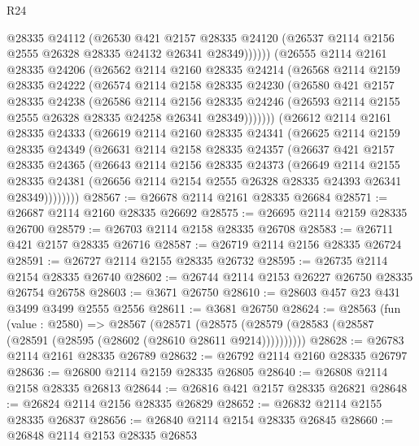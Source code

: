 \begin{lexlean}{R24}
\begin{coremodule}
            @28335
            @24112
            (@26530
              @421
              @2157
              @28335
              @24120
              (@26537 @2114 @2156 @2555 @26328 @28335 @24132 @26341 @28349))))))
    (@26555
      @2114
      @2161
      @28335
      @24206
      (@26562
        @2114
        @2160
        @28335
        @24214
        (@26568
          @2114
          @2159
          @28335
          @24222
          (@26574
            @2114
            @2158
            @28335
            @24230
            (@26580
              @421
              @2157
              @28335
              @24238
              (@26586
                @2114
                @2156
                @28335
                @24246
                (@26593 @2114 @2155 @2555 @26328 @28335 @24258 @26341 @28349)))))))
    (@26612
      @2114
      @2161
      @28335
      @24333
      (@26619
        @2114
        @2160
        @28335
        @24341
        (@26625
          @2114
          @2159
          @28335
          @24349
          (@26631
            @2114
            @2158
            @28335
            @24357
            (@26637
              @421
              @2157
              @28335
              @24365
              (@26643
                @2114
                @2156
                @28335
                @24373
                (@26649
                  @2114
                  @2155
                  @28335
                  @24381
                  (@26656 @2114 @2154 @2555 @26328 @28335 @24393 @26341 @28349))))))))
@28567 := @26678 @2114 @2161 @28335 @26684
@28571 := @26687 @2114 @2160 @28335 @26692
@28575 := @26695 @2114 @2159 @28335 @26700
@28579 := @26703 @2114 @2158 @28335 @26708
@28583 := @26711 @421 @2157 @28335 @26716
@28587 := @26719 @2114 @2156 @28335 @26724
@28591 := @26727 @2114 @2155 @28335 @26732
@28595 := @26735 @2114 @2154 @28335 @26740
@28602 := @26744 @2114 @2153 @26227 @26750 @28335 @26754 @26758
@28603 := @3671 @26750
@28610 := @28603 @457 @23 @431 @3499 @3499 @2555 @2556
@28611 := @3681 @26750
@28624 := @28563
    (fun (value : @2580) =>
    @28567
      (@28571 (@28575 (@28579 (@28583 (@28587 (@28591 (@28595 (@28602 (@28610 @28611 @9214))))))))))
@28628 := @26783 @2114 @2161 @28335 @26789
@28632 := @26792 @2114 @2160 @28335 @26797
@28636 := @26800 @2114 @2159 @28335 @26805
@28640 := @26808 @2114 @2158 @28335 @26813
@28644 := @26816 @421 @2157 @28335 @26821
@28648 := @26824 @2114 @2156 @28335 @26829
@28652 := @26832 @2114 @2155 @28335 @26837
@28656 := @26840 @2114 @2154 @28335 @26845
@28660 := @26848 @2114 @2153 @28335 @26853

\end{coremodule}
\end{lexlean}
